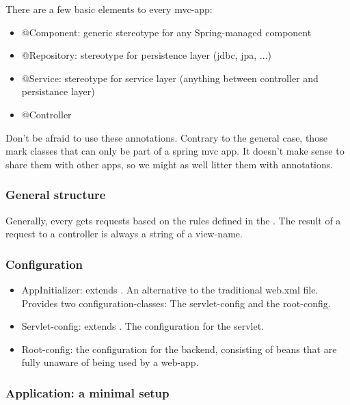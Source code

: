 There are a few basic elements to every mvc-app: 

\begin{itemize}
    \item @Component: generic stereotype for any Spring-managed component
    \item @Repository: stereotype for persistence layer (jdbc, jpa, ...)
    \item @Service: stereotype for service layer (anything between controller and persistance layer)
    \item @Controller
\end{itemize}

Don't be afraid to use these annotations. Contrary to the general case, those mark classes that can only be part of a spring mvc app. It doesn't make sense to share them with other apps, so we might as well litter them with annotations.



\subsubsection{General structure}

Generally, every  gets requests based on the rules defined in the . The result of a request to a controller is always a string of a view-name. 

\subsubsection{Configuration}

\begin{itemize}
    \item AppInitializer: extends . An alternative to the traditional web.xml file. Provides two configuration-classes: The servlet-config and the root-config. 
    
    \item Servlet-config: extends . The configuration for the servlet. 
    
    \item Root-config: the configuration for the backend, consisting of beans that are fully unaware of being used by a web-app. 
\end{itemize}

\subsubsection{Application: a minimal setup}

